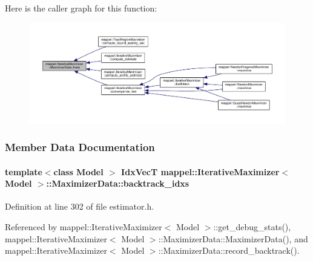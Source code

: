 Here is the caller graph for this function\+:\nopagebreak
\begin{figure}[H]
\begin{center}
\leavevmode
\includegraphics[width=350pt]{classmappel_1_1IterativeMaximizer_1_1MaximizerData_ac6ed5231a1ac2f4bfdd51a2800212fea_icgraph}
\end{center}
\end{figure}




\subsubsection{Member Data Documentation}
\paragraph[{\texorpdfstring{backtrack\+\_\+idxs}{backtrack_idxs}}]{\setlength{\rightskip}{0pt plus 5cm}template$<$class Model $>$ {\bf Idx\+VecT} {\bf mappel\+::\+Iterative\+Maximizer}$<$ Model $>$\+::Maximizer\+Data\+::backtrack\+\_\+idxs\hspace{0.3cm}{\ttfamily [protected]}}\hypertarget{classmappel_1_1IterativeMaximizer_1_1MaximizerData_a088734ca36fdf979d8e57779352b2f79}{}\label{classmappel_1_1IterativeMaximizer_1_1MaximizerData_a088734ca36fdf979d8e57779352b2f79}


Definition at line 302 of file estimator.\+h.



Referenced by mappel\+::\+Iterative\+Maximizer$<$ Model $>$\+::get\+\_\+debug\+\_\+stats(), mappel\+::\+Iterative\+Maximizer$<$ Model $>$\+::\+Maximizer\+Data\+::\+Maximizer\+Data(), and mappel\+::\+Iterative\+Maximizer$<$ Model $>$\+::\+Maximizer\+Data\+::record\+\_\+backtrack().

